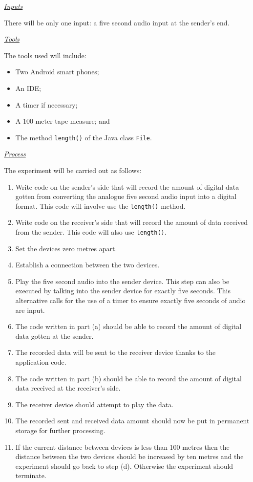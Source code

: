 \documentclass[12pt,svgnames,smaller]{article} %
\begin{document}
\begin{enumerate}
			\textsf{\underline{\emph{Inputs}}}
			
			There will be only one input: a five second audio input at the sender’s end.
			
			\emph{\underline{\textsf{Tools}}}
			
			The tools used will include:
			
			\begin{itemize}
				\item Two Android smart phones;
				\item An IDE;
				\item A timer if necessary;
				\item A 100 meter tape measure; and
				\item The method \texttt{length()} of the Java class \texttt{File}.
			\end{itemize}
			
			\emph{\underline{\textsf{Process}}}
			
			The experiment will be carried out as follows:
			
			\begin{enumerate}
				\item Write code on the sender’s side that will record the amount of digital data gotten from converting the analogue five second audio input into a digital format. This code will involve use the \texttt{length()} method.
				\item Write code on the receiver’s side that will record the amount of data received from the sender. This code will also use \texttt{length()}.
				\item Set the devices zero metres apart.
				\item Establish a connection between the two devices.
				\item Play the five second audio into the sender device. This step can also be executed by talking into the sender device for exactly five seconds. This alternative calls for the use of a timer to ensure exactly five seconds of audio are input.
				\item The code written in part (a) should be able to record the amount of digital data gotten at the sender.
				\item The recorded data will be sent to the receiver device thanks to the application code.
				\item The code written in part (b) should be able to record the amount of digital data received at the receiver’s side.
				\item The receiver device should attempt to play the data. 
				\item The recorded sent and received data amount should now be put in permanent storage for further processing.
				\item If the current distance between devices is less than 100 metres then the distance between the two devices should be increased by ten metres and the experiment should go back to step (d). Otherwise the experiment should terminate. 
			\end{enumerate}
			

\end{enumerate}
\end{document}
